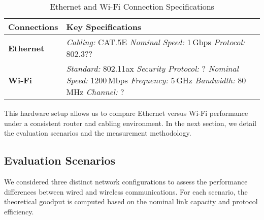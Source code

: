         \begin{table}[ht]
            \small
            \centering
            \begin{tabular}{@{}l p{}@{}}
            \toprule
            \textbf{Connections} & \textbf{Key Specifications} \\
            \midrule
            \textbf{Ethernet} 
                & \textit{Cabling:}     CAT.5E \newline
                \textit{Nominal Speed:} 1\,Gbps    \hspace{2em}    \textit{Protocol:} 802.3?? \\ %
            \midrule
            \textbf{Wi-Fi} 
                & \textit{Standard:}    802.11ax   \hspace{3.6em}  \textit{Security Protocol:} ? \newline %
                \textit{Nominal Speed:} 1200\,Mbps \hspace{0.5em}  \textit{Frequency:} 5\,GHz \newline %
                \textit{Bandwidth:}     80\,MHz    \hspace{3.25em} \textit{Channel:} ? \\ %
            \bottomrule
            \end{tabular}
            \vspace{0.5cm}
            \caption{Ethernet and Wi-Fi Connection Specifications}
            \label{tab:connection-specs}
        \end{table}


        This hardware setup allows us to compare Ethernet versus Wi-Fi performance under a consistent router and cabling environment. 
        In the next section, we detail the evaluation scenarios and the measurement methodology.

    \subsection{Evaluation Scenarios} \label{subsec:evaluation-scenarios}

        We considered three distinct network configurations to assess the performance differences between wired and wireless communications. 
        For each scenario, the theoretical goodput is computed based on the nominal link capacity and protocol efficiency.

